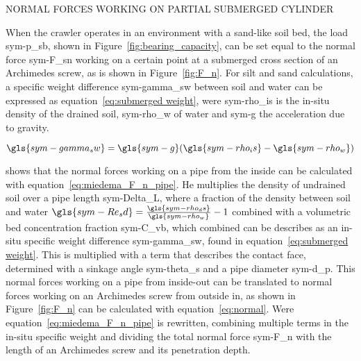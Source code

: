 \begin{RoyalFigure}[!htb, label=fig:F_n]{NORMAL FORCES WORKING ON PARTIAL SUBMERGED CYLINDER}
\end{RoyalFigure}

When the crawler operates in an environment with a sand-like soil bed, the load \gls{sym-p_sb}, shown in
Figure~\ref{fig:bearing_capacity}, can be set equal to the normal force \gls{sym-F_sn} working on a certain point at a
submerged cross section of an Archimedes screw, as is shown in Figure~\ref{fig:F_n}. For silt and sand calculations, a
specific weight difference \gls{sym-gamma_sw} between soil and water can be expressed as equation~\ref{eq:submerged
weight}, were \gls{sym-rho_is} is the in-situ density of the drained soil, \gls{sym-rho_w} of water and \gls{sym-g} the
acceleration due to gravity.

\begin{equation}
    \label{eq:submerged weight}
    \gls{sym-gamma_sw} = \gls{sym-g} (\gls{sym-rho_is} - \gls{sym-rho_w})
\end{equation}

\citet{miedema_slurry_2016} shows that the normal forces working on a pipe from the inside can be calculated with
equation~\ref{eq:miedema_F_n_pipe}. He multiplies the density of undrained soil over a pipe length \gls{sym-Delta_L},
where a fraction of the density between soil and water \( \gls{sym-Re_sd} = \frac{\gls{sym-rho_ds}}{\gls{sym-rho_w}} - 1
\) combined with a volumetric bed concentration fraction \gls{sym-C_vb}, which combined can be describes as an in-situ
specific weight difference \gls{sym-gamma_sw}, found in equation~\ref{eq:submerged weight}. This is multiplied with a
term that describes the contact face, determined with a sinkage angle \gls{sym-theta_s} and a pipe diameter
\gls{sym-d_p}. This normal forces working on a pipe from inside-out can be translated to normal forces working on an
Archimedes screw from outside in, as shown in Figure~\ref{fig:F_n} can be calculated with equation~\ref{eq:normal}. Were
equation~\ref{eq:miedema_F_n_pipe} is rewritten, combining multiple terms in the in-situ specific weight and dividing
the total normal force \gls{sym-F_n} with the length of an Archimedes screw and its penetration depth.

